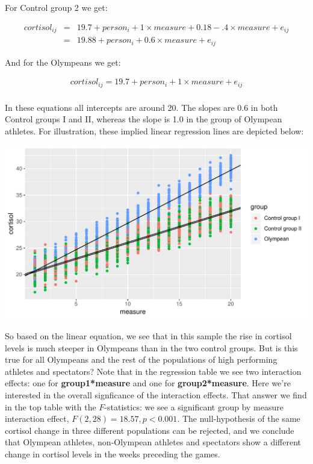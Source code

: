 \documentclass[]{report}\usepackage[]{graphicx}\usepackage[]{color}
\makeatletter
\def\maxwidth{ %
  \ifdim\Gin@nat@width>\linewidth
    \linewidth
  \else
    \Gin@nat@width
  \fi
}
\newenvironment{knitrout}{}{} %
\makeatother
\begin{document}
For Control group 2 we get:

\begin{eqnarray}
cortisol_{ij} &=& 19.7 + person_i + 1 \times measure  + 0.18  - .4  \times measure+   e_{ij} \nonumber \\
        &=&   19.88 + person_i   + 0.6 \times measure    +   e_{ij}    \nonumber
\end{eqnarray}

And for the Olympeans we get:

\begin{eqnarray}
cortisol_{ij} = 19.7 + person_i + 1 \times measure  +   e_{ij} \nonumber \\
\end{eqnarray}


In these equations all intercepts are around 20. The slopes are 0.6 in both Control groups I and II, whereas the slope is 1.0 in the group of Olympean athletes. For illustration, these implied linear regression lines are depicted below:


\begin{knitrout}
\color{fgcolor}

{\centering \includegraphics[width=\maxwidth]{figure/analysismixed20_3-1} 

}



\end{knitrout}

So based on the linear equation, we see that in this sample the rise in cortisol levels is much steeper in Olympeans than in the two control groups. But is this true for all Olympeans and the rest of the populations of high performing athletes and spectators? Note that in the regression table we see two interaction effects: one for \textbf{group1*measure} and one for \textbf{group2*measure}. Here we're interested in the overall signficance of the interaction effects. That answer we find in the top table with the $F$-statistics: we see a significant group by measure interaction effect, $F(2, 28)= 18.57, p<0.001$. The null-hypothesis of the same cortisol change in three different populations can be rejected, and we conclude that Olympean athletes, non-Olympean athletes and spectators show a different change in cortisol levels in the weeks preceding the games.  
\end{document}
